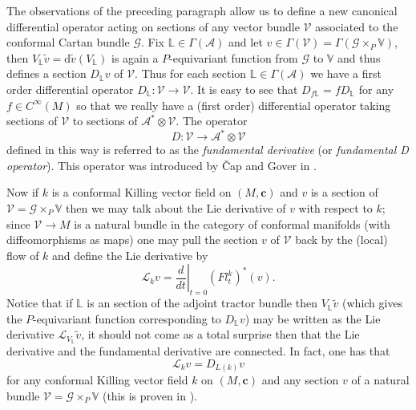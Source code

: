\documentclass[a4paper,12pt]{amsart}
\newcommand{\cc}{\boldsymbol{c}}
\theoremstyle{remark}
\begin{document}
The observations of the preceding paragraph allow us to define a new canonical differential operator acting on sections of any vector bundle $\mathcal{V}$ associated to the conformal Cartan bundle $\mathcal{G}$. Fix $\mathbb{L}\in \Gamma(\mathcal{A})$ and let $v\in \Gamma(\mathcal{V})= \Gamma(\mathcal{G}\times_P \mathbb{V})$, then $V_{\mathbb{L}}\tilde{v}=\mathrm{d}\tilde{v}(V_{\mathbb{L}})$ is again a $P$-equivariant function from $\mathcal{G}$ to $\mathbb{V}$ and thus defines a section $D_\mathbb{L} v$ of $\mathcal{V}$. Thus for each section $\mathbb{L}\in \Gamma(\mathcal{A})$ we have a first order differential operator $D_\mathbb{L}:\mathcal{V}\rightarrow \mathcal{V}$. It is easy to see that $D_{f\mathbb{L}}=fD_\mathbb{L}$ for any $f\in C^\infty(M)$ so that we really have a (first order) differential operator taking sections of $\mathcal{V}$ to sections of $\mathcal{A}^*\otimes \mathcal{V}$. The operator
$$
D:\mathcal{V}\rightarrow \mathcal{A}^*\otimes \mathcal{V}
$$
defined in this way is referred to as the \emph{fundamental derivative} (or \emph{fundamental D operator}). This operator was introduced by \v Cap and Gover in \cite{CapGoTAMS}.

Now if $k$ is a conformal Killing vector field on $(M,\cc)$ and $v$ is a section of $\mathcal{V}=\mathcal{G}\times_P \mathbb{V}$ then we may talk about the Lie derivative of $v$ with respect to $k$; since $\mathcal{V}\rightarrow M$ is a natural bundle in the category of conformal manifolds (with diffeomorphisms as maps) one may pull the section $v$ of $\mathcal{V}$ back by the (local) flow of $k$ and define the Lie derivative by
$$
\mathcal{L}_k v = \left.\frac{d}{dt}\right|_{t=0}(Fl^k_t)^*(v).
$$
Notice that if $\mathbb{L}$ is an section of the adjoint tractor bundle then $V_{\mathbb{L}}\tilde{v}$ (which gives the $P$-equivariant function corresponding to $D_{\mathbb{L}}v$) may be written as the Lie derivative $\mathcal{L}_{V_{\mathbb{L}}}\tilde{v}$, it should not come as a total surprise then that the Lie derivative and the fundamental derivative are connected. In fact, one has that
$$
\mathcal{L}_k v = D_{L(k)} v
$$
for any conformal Killing vector field $k$ on $(M,\cc)$ and any section $v$ of a natural bundle $\mathcal{V}=\mathcal{G}\times_P \mathbb{V}$ (this is proven in \cite{SeanMSc}). 
\end{document}
